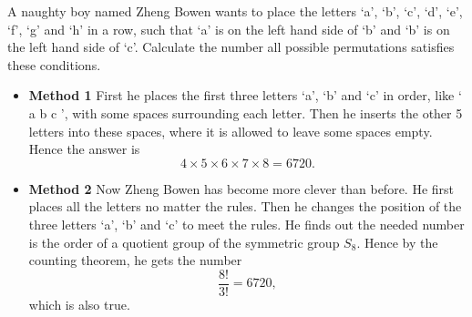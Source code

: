 \documentclass{assignment}[2019/10/15]
\begin{document}
    \begin{problem}
        A naughty boy named Zheng Bowen wants to place the letters `a', `b', `c', `d', `e', `f', `g' and `h' in a row, such that `a' is on the left hand side of `b' and `b' is on the left hand side of `c'. Calculate the number all possible permutations satisfies these conditions.
    \end{problem}
    \begin{solution}\hspace{\fill}
        \begin{itemize}
            \item \textbf{Method 1} First he places the first three letters `a', `b' and `c' in order, like ` a b c ', with some spaces surrounding each letter. Then he inserts the other 5 letters into these spaces, where it is allowed to leave some spaces empty. Hence the answer is
            \begin{equation}
                4\times 5\times 6\times 7\times 8=6720.
            \end{equation}
            \item \textbf{Method 2} Now Zheng Bowen has become more clever than before. He first places all the letters no matter the rules. Then he changes the position of the three letters `a', `b' and `c' to meet the rules. He finds out the needed number is the order of a quotient group of the symmetric group $S_8$. Hence by the counting theorem, he gets the number
            \begin{equation}
                \frac{8!}{3!}=6720,
            \end{equation}
            which is also true.
        \end{itemize}
    \end{solution}
\end{document}
